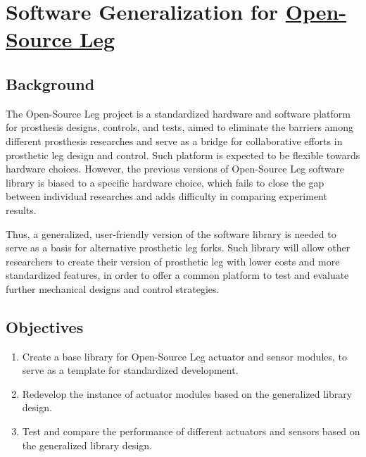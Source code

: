 \documentclass[12pt]{article}
\begin{document}
\section{Software Generalization for \href{https://www.opensourceleg.org/}{Open-Source Leg}}


\subsection{Background}



The Open-Source Leg project is a standardized hardware and software platform for prosthesis designs, controls, and tests, aimed to eliminate the barriers among different prosthesis researches and serve as a bridge for collaborative efforts in prosthetic leg design and control. Such platform is expected to be flexible towards hardware choices. However, the previous versions of Open-Source Leg software library is biased to a specific hardware choice, which fails to close the gap between individual researches and adds difficulty in comparing experiment results. 

Thus, a generalized, user-friendly version of the software library is needed to serve as a basis for alternative prosthetic leg forks. Such library will allow other researchers to create their version of prosthetic leg with lower costs and more standardized features, in order to offer a common platform to test and evaluate further mechanical designs and control strategies.


\subsection{Objectives}

\begin{enumerate}
    \item {Create a base library for Open-Source Leg actuator and sensor modules, to serve as a template for standardized development.}
    \item {Redevelop the instance of actuator modules based on the generalized library design.}
    \item {Test and compare the performance of different actuators and sensors based on the generalized library design.}
\end{enumerate}
\end{document}

